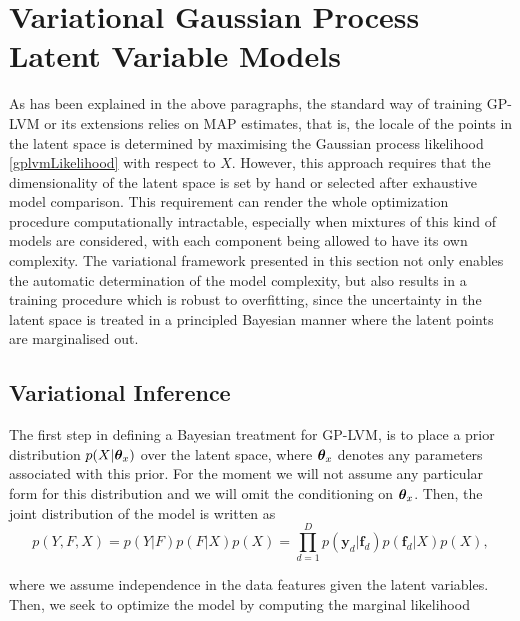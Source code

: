 \documentclass [10pt , a4paper]{article}
\begin{document}
 \section{\label{section:vgplvm}Variational Gaussian Process Latent Variable Models}
As has been explained in the above paragraphs, the standard way of training GP-LVM or its extensions relies on MAP estimates,
 that is, the locale of the points in the latent space is determined by maximising the Gaussian process likelihood \eqref{gplvmLikelihood}
 with respect to $X$. However, this approach requires that the dimensionality of the latent space is set by hand
 or selected after exhaustive model comparison. This requirement can render the whole optimization procedure 
computationally intractable, especially when mixtures of this kind of models are considered, with each component
 being allowed to have its own complexity. The variational framework presented in this section not only enables
 the automatic determination of the model complexity, but also results in a training procedure which is robust 
to overfitting, since the uncertainty in the latent space is treated in a principled Bayesian manner where the
 latent points are marginalised out.



\subsection{\label{section:vgplvmBound} Variational Inference}
\par The first step in defining a Bayesian treatment for GP-LVM, is to place a prior distribution $p(X|\boldsymbol \theta_x)$ over the latent space,
where $\boldsymbol \theta_x$ denotes any parameters associated with this prior.
For the moment we will not assume any particular form for this distribution and we will omit the conditioning on $\boldsymbol \theta_x$. Then, the
joint distribution of the model is written as
\begin{equation}
\label{joint}
p(Y,F, X) = p(Y|F) p(F|X) p(X)= 
 \prod_{d=1}^D  p(\mathbf{y}_d | \mathbf{f}_d) p(\mathbf{f}_d |
 \mathit{X}) p(X),
\end{equation}

\noindent where we assume independence in the data features given the latent variables.
Then, we seek to optimize the model by computing the marginal likelihood
\end{document}
